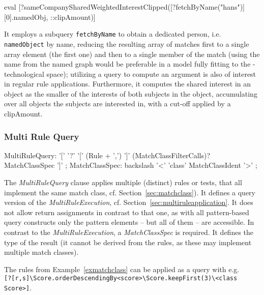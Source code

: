 \begin{example}
  \begin{grshell}
eval [?sameCompanySharedWeightedInterestClipped([?fetchByName("hans")][0].namedObj, ::clipAmount)]
  \end{grshell}
	
It employs a subquery \texttt{fetchByName} to obtain a dedicated person, i.e. \texttt{namedObject} by name, reducing the resulting array of matches first to a single array element (the first one) and then to a single member of the match (using the name from the named graph would be preferable in a model fully fitting to the \GrG-technological space); utilizing a query to compute an argument is also of interest in regular rule applications.
Furthermore, it computes the shared interest in an object as the smaller of the interests of both subjects in the object, accumulating over all objects the subjects are interested in, with a cut-off applied by a clipAmount.
\end{example}

\subsubsection*{Multi Rule Query}

\begin{rail}
  MultiRuleQuery: '[' '?' '[' (Rule + ',') ']' (MatchClassFilterCalls)? MatchClassSpec ']' ;
  MatchClassSpec: backslash '<' 'class' MatchClassIdent '>' ;
\end{rail}

The \emph{MultiRuleQuery} clause applies multiple (distinct) rules or tests, that all implement the same match class, cf. Section~\ref{sec:matchclass}).
It defines a query version of the \emph{MultiRuleExecution}, cf. Section~\ref{sec:multiruleapplication}.
It does not allow return assignments in contrast to that one, as with all pattern-based query constructs only the pattern elements -- but all of them -- are accessible.
In contrast to the \emph{MultiRuleExecution}, a \emph{MatchClassSpec} is required. 
It defines the type of the result (it cannot be derived from the rules, as these may implement multiple match classes).

\begin{example}
The rules from Example~\ref{exmatchclass} can be applied as a query with e.g. \\
\verb#[?[r,s]\Score.orderDescendingBy<score>\Score.keepFirst(3)\<class Score>]#.
\end{example}



